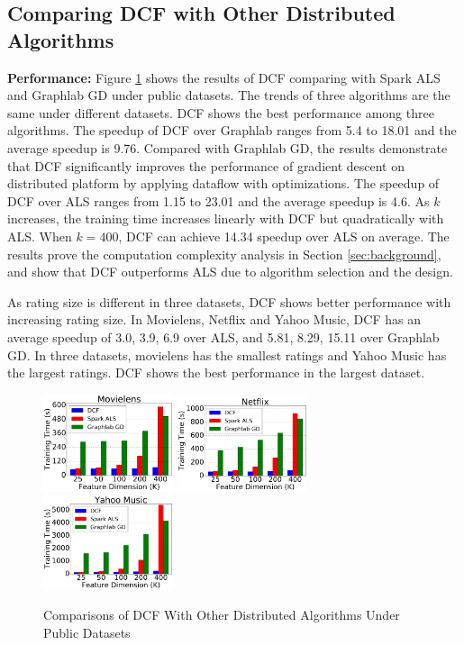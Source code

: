 \documentclass{llncs}
\begin{document}
\subsection{Comparing DCF with Other Distributed Algorithms}
\label{sub:dcf}

\textbf{Performance:} Figure \ref{fig:dcfPerformance} shows the results of DCF comparing with Spark ALS and Graphlab GD under public datasets. The trends of three algorithms are the same under different datasets. DCF shows the best performance among three algorithms. The speedup of DCF over Graphlab ranges from 5.4 to 18.01 and the average speedup is 9.76. Compared with Graphlab GD, the results demonstrate that DCF significantly improves the performance of gradient descent on distributed platform by applying dataflow with optimizations. The speedup of DCF over ALS ranges from 1.15 to 23.01 and the average speedup is 4.6. As $k$ increases, the training time increases linearly with DCF but quadratically with ALS. When $k=400$, DCF can achieve 14.34 speedup over ALS on average. The results prove the computation complexity analysis in Section \ref{sec:background}, and show that DCF outperforms ALS due to algorithm selection and the design.

As rating size is different in three datasets, DCF shows better performance with increasing rating size. In Movielens, Netflix and Yahoo Music, DCF has an average speedup of 3.0, 3.9, 6.9 over ALS, and 5.81, 8.29, 15.11 over Graphlab GD. In three datasets, movielens has the smallest ratings and Yahoo Music has the largest ratings. DCF shows the best performance in the largest dataset.

\begin{figure}[!t]
\centering
\includegraphics[width=1.5in]{pics/movielens.pdf}
\includegraphics[width=1.5in]{pics/netflix.pdf}
\includegraphics[width=1.5in]{pics/yahoo.pdf}
\caption{Comparisons of DCF With Other Distributed Algorithms Under Public Datasets}
\vspace{-15pt}
\label{fig:dcfPerformance}
\end{figure}
\end{document}
